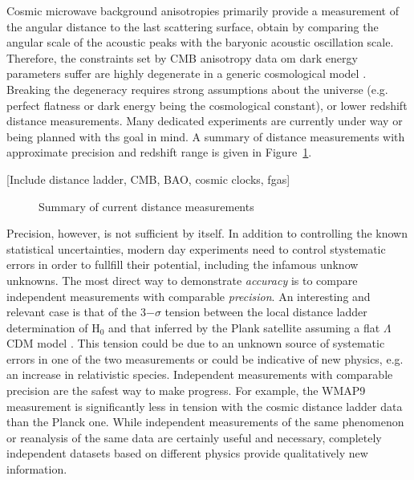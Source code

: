 Cosmic microwave background anisotropies primarily provide a
measurement of the angular distance to the last scattering surface,
obtain by comparing the angular scale of the acoustic peaks with the
baryonic acoustic oscillation scale. Therefore, the constraints set by
CMB anisotropy data om dark energy parameters suffer are highly
degenerate in a generic cosmological model
\cite[e.g.,][]{Pla15}. Breaking the degeneracy requires strong
assumptions about the universe (e.g. perfect flatness or dark energy
being the cosmological constant), or lower redshift distance
measurements. Many dedicated experiments are currently under way or
being planned with ths goal in mind. A summary of distance
measurements with approximate precision and redshift range is given in
Figure~\ref{fig:comparedist}.

[Include distance ladder, CMB, BAO, cosmic clocks, fgas]

\begin{figure}[!t]
\begin{center}
\caption{Summary of current distance measurements}
\label{fig:comparedist}
\end{center}
\end{figure}


Precision, however, is not sufficient by itself. In addition to
controlling the known statistical uncertainties, modern day
experiments need to control stystematic errors in order to fullfill
their potential, including the infamous unknow unknowns. The most
direct way to demonstrate {\it accuracy} is to compare independent
measurements with comparable {\it precision}. An interesting and
relevant case is that of the 3$-\sigma$ tension between the local
distance ladder determination of H$_0$ \cite{Rie++16} and that
inferred by the Plank satellite assuming a flat $\Lambda$CDM model
\cite{Pla+15}. This tension could be due to an unknown source of systematic
errors in one of the two measurements or could be indicative of new
physics, e.g. an increase in relativistic species. Independent
measurements with comparable precision are the safest way to make
progress. For example, the WMAP9 measurement \cite{Cal++13} is
significantly less in tension with the cosmic distance ladder data
than the Planck one. While independent measurements of the same
phenomenon or reanalysis of the same data \cite{Efs14,SFH15} are
certainly useful and necessary, completely independent datasets based
on different physics provide qualitatively new information.


